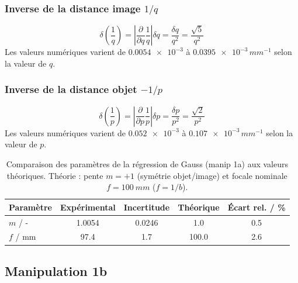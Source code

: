﻿\documentclass[a4paper, 11pt]{article}
\begin{document}
\subsubsection{Inverse de la distance image \texorpdfstring{$1/q$}{1/q}}

\begin{equation}
  \delta\!\left(\frac{1}{q}\right)
  = \left|\frac{\partial}{\partial q}\frac{1}{q}\right| \delta q
  = \frac{\delta q}{q^2}
  = \frac{\sqrt{5}}{q^2}
\end{equation}
Les valeurs numériques varient de
$\num{0.0054e-3}$ à $\num{0.0395e-3}\,\si{mm^{-1}}$
selon la valeur de $q$.

\subsubsection{Inverse de la distance objet \texorpdfstring{$-1/p$}{-1/p}}

\begin{equation}
  \delta\!\left(\frac{1}{p}\right)
  = \left|\frac{\partial}{\partial p}\frac{1}{p}\right| \delta p
  = \frac{\delta p}{p^2}
  = \frac{\sqrt{2}}{p^2}
\end{equation}
Les valeurs numériques varient de
$\num{0.052e-3}$ à $\num{0.107e-3}\,\si{mm^{-1}}$
selon la valeur de $p$.


\begin{table}[H]
\centering
\caption{Comparaison des paramètres de la régression de Gauss (manip 1a)
  aux valeurs théoriques. Théorie : pente $m=+1$ (symétrie objet/image)
  et focale nominale $f=\SI{100}{mm}$ ($f=1/b$).}
\label{tab:reg_compar}
\setlength{\tabcolsep}{8pt}
\begin{tabular}{lcccc}
\toprule
Paramètre & Expérimental & Incertitude & Théorique & Écart rel. / \si{\percent} \\
\midrule
$m$ / -  & \num{1.0054} & \num{0.0246} & \num{1.0}   & \num{0.5} \\
$f$ / mm    & \num{97.4}  & \num{1.7}    & \num{100.0} & \num{2.6}  \\
\bottomrule
\end{tabular}
\end{table}

\subsection{Manipulation 1b}
\end{document}

